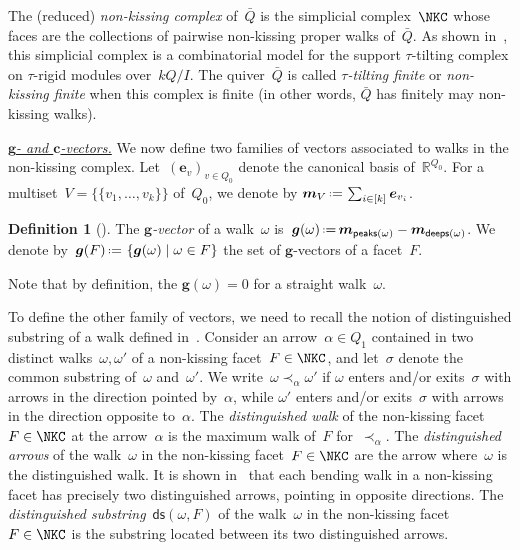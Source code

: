 \documentclass{amsart}
\theoremstyle{definition}
\newtheorem{definition}[theorem]{Definition}
\newcommand{\R}{\mathbb{R}} %
\renewcommand{\b}[1]{{\boldsymbol{#1}}} %
\newcommand{\set}[2]{\left\{ #1 \;\middle|\; #2 \right\}} %
\newcommand{\eqdef}{\mbox{\,\raisebox{0.2ex}{\scriptsize\ensuremath{\mathrm:}}\ensuremath{=}\,}} %
\newcommand{\darkblue}{\color{darkblue}} %
\newcommand{\defn}[1]{\textsl{\darkblue #1}} %
\newcommand{\para}[1]{\medskip\noindent\uline{\textit{#1.}}} %
\newcommand{\multiplicityVector}{\b{m}} %
\newcommand{\gvector}[1]{\b{g}(#1)} %
\newcommand{\gvectors}[1]{\b{g}(#1)} %
\newcommand{\quiver}{\bar Q} %
\newcommand{\peaks}[1]{\mathsf{peaks}(#1)} %
\newcommand{\deeps}[1]{\mathsf{deeps}(#1)} %
\newcommand{\distinguishedString}[2]{\mathsf{ds}(#1,#2)} %
\begin{document}
%
The (reduced) \defn{non-kissing complex} of~$\quiver$ is the simplicial complex~$\NKC$ whose faces are the collections of pairwise non-kissing proper walks of~$\quiver$.
As shown in~\cite[Thm.~2.46]{PaluPilaudPlamondon-nonkissing}, this simplicial complex is a combinatorial model for the support $\tau$-tilting complex on $\tau$-rigid modules over~$kQ/I$.
The quiver~$\quiver$ is called \defn{$\tau$-tilting finite} or \defn{non-kissing finite} when this complex is finite (in other words, $\quiver$ has finitely may non-kissing walks).

\para{$\b{g}$- and $\b{c}$-vectors}
%
We now define two families of vectors associated to walks in the non-kissing complex.
Let~$(\b{e}_v)_{v \in Q_0}$ denote the canonical basis of~$\R^{Q_0}$.
For a multiset~$V = \{\!\{v_1, \dots, v_k\}\!\}$ of~$Q_0$, we denote by $\multiplicityVector_V \eqdef \sum_{i \in [k]} \b{e}_{v_i}$.

\begin{definition}[{\cite[Def.~{4.8}]{PaluPilaudPlamondon-nonkissing}}]
The \defn{$\b{g}$-vector} of a walk~$\omega$ is~$\gvector{\omega} \eqdef \multiplicityVector_{\peaks{\omega}} - \multiplicityVector_{\deeps{\omega}}$.
We denote by~$\gvectors{F} \eqdef \set{\gvector{\omega}}{\omega \in F}$ the set of $\b{g}$-vectors of a facet~$F$.
\end{definition}

Note that by definition, the $\gvector{\omega} = 0$ for a straight walk~$\omega$.

To define the other family of vectors, we need to recall the notion of distinguished substring of a walk defined in~\cite[Def.~2.25]{PaluPilaudPlamondon-nonkissing}.
Consider an arrow~$\alpha \in Q_1$ contained in two distinct walks~$\omega, \omega'$ of a non-kissing facet~$F \in \NKC$, and let~$\sigma$ denote the common substring of~$\omega$ and~$\omega'$.
We write~$\omega \prec_\alpha \omega'$ if $\omega$ enters and/or exits~$\sigma$ with arrows in the direction pointed by~$\alpha$, while $\omega'$ enters and/or exits~$\sigma$ with arrows in the direction opposite to~$\alpha$.
The \defn{distinguished walk} of the non-kissing facet~$F \in \NKC$ at the arrow~$\alpha$ is the maximum walk of~$F$ for~$\prec_\alpha$.
The \defn{distinguished arrows} of the walk~$\omega$ in the non-kissing facet~$F \in \NKC$ are the arrow where~$\omega$ is the distinguished walk.
It is shown in~\cite[Prop.~2.28]{PaluPilaudPlamondon-nonkissing} that each bending walk in a non-kissing facet has precisely two distinguished arrows, pointing in opposite directions.
The \defn{distinguished substring}~$\distinguishedString{\omega}{F}$ of the walk~$\omega$ in the non-kissing facet~$F \in \NKC$ is the substring located between its two distinguished arrows.
\end{document}
